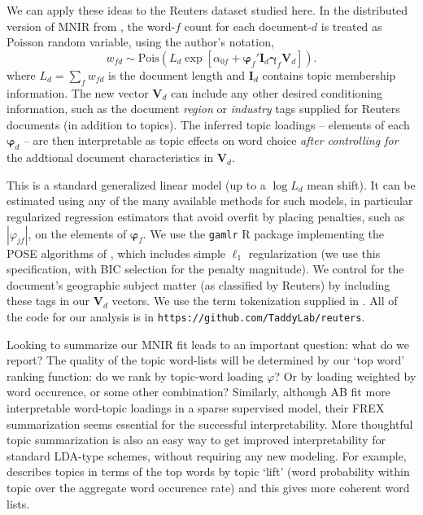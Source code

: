 \documentclass[12pt]{article}
\newcommand{\bs}[1]{\boldsymbol{#1}}
\newcommand{\mr}[1]{\mathrm{#1}}
\newcommand{\bm}[1]{\mathbf{#1}}
\begin{document}
We can apply these ideas to the Reuters dataset studied here.  In the
distributed version of MNIR from \cite{taddy_distributed_2015}, the word-$f$
count for each document-$d$ is treated as Poisson random variable, using the
author's notation, \begin{equation}\label{eq:taddyglm} w_{fd} \sim
\mr{Pois}\left( L_d \exp\left[ \alpha_{0f} + \bs{\varphi}_f'\bm{I}_d
\bs{\gamma}_f\bm{V}_d\right]\right). \end{equation} where $L_d = \sum_f
w_{fd}$ is the document length and $\bm{I}_d$ contains topic membership
information.  The new vector $\bm{V}_d$ can include any other desired
conditioning information, such as the document {\it region} or {\it industry}
tags supplied for Reuters documents (in addition to topics).  The inferred
topic loadings -- elements of each $\bs{\varphi}_d$ -- are then interpretable
as topic effects on word choice {\it after controlling for} the addtional
document characteristics in $\bm{V}_d$.  

This is a standard generalized linear model (up to a $\log L_d$ mean shift).  It can be estimated using any of the many available methods for such models, in particular regularized regression estimators that avoid overfit by placing penalties, such as $|\varphi_{jf}|$, on the elements of $\bs{\varphi}_f$.  We use the {\tt gamlr} R package implementing the POSE algorithms of \cite{taddy_one-step_2015}, which includes simple $\ell_1$ regularization (we use this specification, with BIC selection for the penalty magnitude).  We control for the document's geographic subject matter (as classified by Reuters) by including these tags in our $\bm{V}_d$ vectors.  We use the term tokenization supplied in \cite{lewis2004rcv1}.  All of the code for our analysis is in {\tt https://github.com/TaddyLab/reuters}.

Looking to summarize our MNIR fit leads to an important question: what do we report?  The quality of the topic word-lists will be determined by our `top word' ranking function: do we rank by topic-word loading $\varphi$? Or by loading weighted by word occurence, or some other combination?  
Similarly, although AB fit more interpretable word-topic loadings in a sparse supervised model, their FREX summarization seems essential for the successful interpretability.  More thoughtful topic summarization is also an easy way to get improved interpretability for standard LDA-type schemes, without requiring any new modeling.  For example, \cite{taddy_estimation_2012} describes topics in terms of the top words by topic `lift' (word probability within topic over the aggregate word occurence rate) and this gives more coherent word lists.
\end{document}
